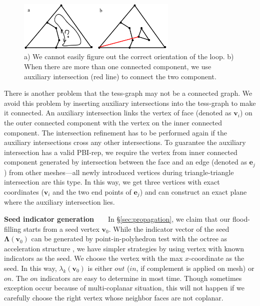 \documentclass[10pt,journal,compsoc]{IEEEtran}
\begin{document}
\begin{figure}[h]
\centering
\includegraphics[width=3in]{dual}
\caption{a) We cannot easily figure out the correct orientation of the loop. b) When there are more than one connected component, we use auxiliary intersection (red line) to connect the two component. }
\label{fig:dual}
\end{figure}


\vspace{0.5em} There is another problem that the tess-graph may not be a connected graph. We avoid this problem by inserting auxiliary intersections into the tess-graph to make it connected. An auxiliary intersection links the vertex of face (denoted as $\bm{v}_i$) on the outer connected component with the vertex on the inner connected component. The intersection refinement has to be performed again if the auxiliary intersections cross any other intersections. To guarantee the auxiliary intersection has a valid PBI-rep, we require the vertex from inner connected component generated by intersection between the face and an edge (denoted as $\bm{e}_j$) from other meshes---all newly introduced vertices during triangle-triangle intersection are this type. In this way, we get three vertices with exact coordinates ($\bm{v}_i$ and the two end points of $\bm{e}_j$) and can construct an exact plane where the auxiliary intersection lies.

\vspace{0.5em}
\noindent\textbf{Seed indicator generation}~~~~In \S\ref{sec:propagation}, we claim that our flood-filling starts from a seed vertex $\bm{v}_0$. While the indicator vector of the seed $\bm{\Lambda}(\bm{v}_0)$ can be generated by point-in-polyhedron test \cite{ogayar2005point} with the octree as acceleration structure \cite{frisken2002simple}, we have simpler strategies by using vertex with known indicators as the seed. We choose the vertex with the max $x$-coordinate as the seed. In this way, $\lambda_k(\bm{v}_0)$ is either $out$ ($in$, if complement is applied on mesh) or $on$. The $on$ indicators are easy to determine in most time. Though sometimes exception occur because of multi-coplanar situation, this will not happen if we carefully choose the right vertex whose neighbor faces are not coplanar.
\end{document}
